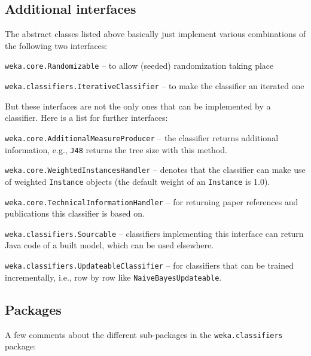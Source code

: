 \newpage
\subsection{Additional interfaces}
The abstract classes listed above basically just implement various combinations
of the following two interfaces:
\begin{tight_itemize}
  \item \texttt{weka.core.Randomizable} -- to allow (seeded) randomization
taking place
  \item \texttt{weka.classifiers.IterativeClassifier} -- to make the classifier
an iterated one
\end{tight_itemize}
But these interfaces are not the only ones that can be implemented by
a classifier. Here is a list for further interfaces:
\begin{tight_itemize}
  \item \texttt{weka.core.AdditionalMeasureProducer} -- the classifier returns
additional information, e.g., \texttt{J48} returns the tree size with this
method.
  \item \texttt{weka.core.WeightedInstancesHandler} -- denotes that the
classifier can make use of weighted \texttt{Instance} objects (the
default weight of an \texttt{Instance} is 1.0).
  \item \texttt{weka.core.TechnicalInformationHandler} -- for returning paper
references and publications this classifier is based on.
  \item \texttt{weka.classifiers.Sourcable} -- classifiers implementing this
interface can return Java code of a built model, which can be used elsewhere.
  \item \texttt{weka.classifiers.UpdateableClassifier} -- for classifiers that
can be trained incrementally, i.e., row by row like
\texttt{NaiveBayesUpdateable}.
\end{tight_itemize}

\subsection{Packages}
A few comments about the different sub-packages in the \texttt{weka.classifiers}
package:

